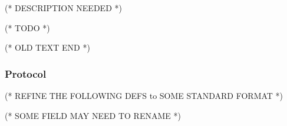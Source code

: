 \documentclass{article}
\begin{document}



(* DESCRIPTION NEEDED *)



(* TODO *)



(* OLD TEXT END *)


\subsubsection{Protocol}



(* REFINE THE FOLLOWING DEFS to SOME STANDARD FORMAT *)



(* SOME FIELD MAY NEED TO RENAME *)
\end{document}
